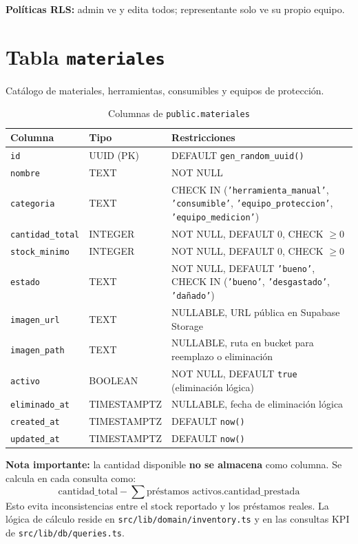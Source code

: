 \documentclass[12pt,a4paper,oneside]{report}
\newcommand{\file}[1]{\texttt{\color{cecyteDark}#1}}
\begin{document}
\textbf{Políticas RLS:} admin ve y edita todos; representante solo ve su propio equipo.

\section{Tabla \texttt{materiales}}

Catálogo de materiales, herramientas, consumibles y equipos de protección.

\begin{table}[H]
\centering
\caption{Columnas de \file{public.materiales}}
\begin{tabular}{@{}L{3.5cm}L{4cm}L{8cm}@{}}
\toprule
{}
\textbf{Columna} & \textbf{Tipo} & \textbf{Restricciones} \\
\midrule
\file{id}              & UUID (PK) & DEFAULT \file{gen\_random\_uuid()} \\
\file{nombre}          & TEXT      & NOT NULL \\
\file{categoria}       & TEXT      & CHECK IN (\file{'herramienta\_manual'}, \file{'consumible'}, \file{'equipo\_proteccion'}, \file{'equipo\_medicion'}) \\
\file{cantidad\_total} & INTEGER   & NOT NULL, DEFAULT 0, CHECK \(\ge 0\) \\
\file{stock\_minimo}   & INTEGER   & NOT NULL, DEFAULT 0, CHECK \(\ge 0\) \\
\file{estado}          & TEXT      & NOT NULL, DEFAULT \file{'bueno'}, CHECK IN (\file{'bueno'}, \file{'desgastado'}, \file{'dañado'}) \\
\file{imagen\_url}     & TEXT      & NULLABLE, URL pública en Supabase Storage \\
\file{imagen\_path}    & TEXT      & NULLABLE, ruta en bucket para reemplazo o eliminación \\
\file{activo}          & BOOLEAN   & NOT NULL, DEFAULT \file{true} (eliminación lógica) \\
\file{eliminado\_at}   & TIMESTAMPTZ& NULLABLE, fecha de eliminación lógica \\
\file{created\_at}      & TIMESTAMPTZ& DEFAULT \file{now()} \\
\file{updated\_at}      & TIMESTAMPTZ& DEFAULT \file{now()} \\
\bottomrule
\end{tabular}
\end{table}

\begin{notebox}
\textbf{Nota importante:} la cantidad disponible \textbf{no se almacena} como columna. Se calcula en cada consulta como:
\[
\text{cantidad\_total} - \sum \text{préstamos activos.cantidad\_prestada}
\]
Esto evita inconsistencias entre el stock reportado y los préstamos reales. La lógica de cálculo reside en \file{src/lib/domain/inventory.ts} y en las consultas KPI de \file{src/lib/db/queries.ts}.
\end{notebox}
\end{document}

